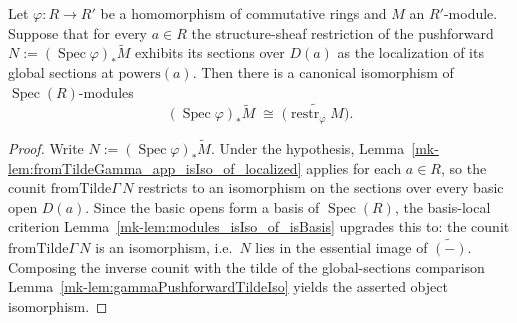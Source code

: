 \begin{lemma}\label{mk-lem:pushforward_spec_tilde_iso_conditional}
  \leanok

  Let \(\varphi : R \to R'\) be a homomorphism of commutative rings and \(M\) an
  \(R'\)-module. Suppose that for every \(a \in R\) the structure-sheaf restriction
  of the pushforward \(N := (\operatorname{Spec}\varphi)_*\widetilde M\) exhibits its
  sections over \(D(a)\) as the localization of its global sections at
  \(\mathrm{powers}(a)\). Then there is a canonical isomorphism of
  \(\operatorname{Spec}(R)\)-modules
  \[
    (\operatorname{Spec}\varphi)_*\widetilde M \;\cong\;
    \widetilde{\bigl(\operatorname{restr}_\varphi M\bigr)} .
  \]
\end{lemma}

\begin{proof}
  \leanok
  Write \(N := (\operatorname{Spec}\varphi)_*\widetilde M\). Under the hypothesis,
  Lemma~\ref{mk-lem:fromTildeGamma_app_isIso_of_localized} applies for each \(a \in R\),
  so the counit \(\mathrm{fromTilde}\Gamma\,N\) restricts to an isomorphism on the
  sections over every basic open \(D(a)\). Since the basic opens form a basis of
  \(\operatorname{Spec}(R)\), the basis-local criterion
  Lemma~\ref{mk-lem:modules_isIso_of_isBasis} upgrades this to: the counit
  \(\mathrm{fromTilde}\Gamma\,N\) is an isomorphism, i.e.\ \(N\) lies in the
  essential image of \(\widetilde{(-)}\). Composing the inverse counit with the
  tilde of the global-sections comparison
  Lemma~\ref{mk-lem:gammaPushforwardTildeIso} yields the asserted object isomorphism.
\end{proof}

